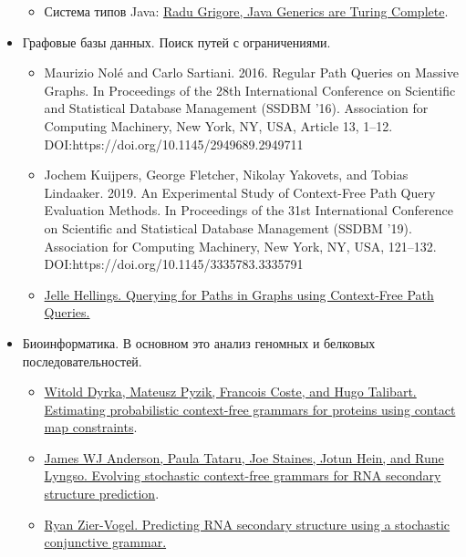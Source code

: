 \begin{itemize}
\begin{itemize}
    \item Система типов Java: \href{https://arxiv.org/abs/1605.05274}{Radu Grigore, Java Generics are Turing Complete}.
  \end{itemize}

  \item Графовые базы данных. Поиск путей с ограничениями. 
    \begin{itemize}
      \item Maurizio Nolé and Carlo Sartiani. 2016. Regular Path Queries on Massive Graphs. In Proceedings of the 28th International Conference on Scientific and Statistical Database Management (SSDBM ’16). Association for Computing Machinery, New York, NY, USA, Article 13, 1–12. DOI:https://doi.org/10.1145/2949689.2949711
      \item Jochem Kuijpers, George Fletcher, Nikolay Yakovets, and Tobias Lindaaker. 2019. An Experimental Study of Context-Free Path Query Evaluation Methods. In Proceedings of the 31st International Conference on Scientific and Statistical Database Management (SSDBM ’19). Association for Computing Machinery, New York, NY, USA, 121–132. DOI:https://doi.org/10.1145/3335783.3335791
      \item \href{https://arxiv.org/abs/1502.02242}{Jelle Hellings. Querying for Paths in Graphs using Context-Free Path Queries.}
    \end{itemize}

  \item Биоинформатика. В основном это анализ геномных и белковых последовательностей.
    \begin{itemize}
      \item \href{https://www.ncbi.nlm.nih.gov/pmc/articles/PMC6428041/}{Witold Dyrka, Mateusz Pyzik, Francois Coste, and Hugo Talibart. Estimating probabilistic context-free grammars for proteins using contact map constraints}.
      \item \href{https://www.ncbi.nlm.nih.gov/pmc/articles/PMC3464655/}{James WJ Anderson, Paula Tataru, Joe Staines, Jotun Hein, and Rune Lyngso. Evolving stochastic context-free grammars for RNA secondary structure prediction}.
      \item \href{https://www.semanticscholar.org/paper/Predicting-RNA-secondary-structure-using-a-grammar-Zier-Vogel/90bb312cb1a0f61eddb7a8b5b782bb40630894dd}{Ryan Zier-Vogel. Predicting RNA secondary structure using a stochastic conjunctive grammar.}
    \end{itemize}


\end{itemize}
